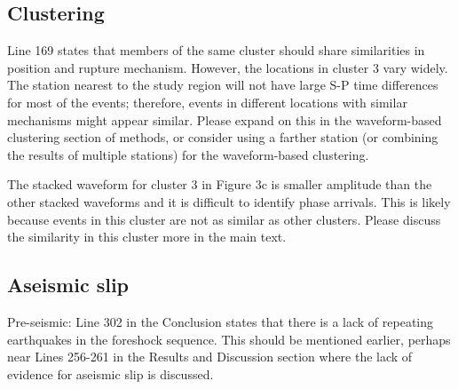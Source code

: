 \documentclass[10pt]{extarticle}
\begin{document}
\begin{Answer}
 \WorkInProgressRevTask
\end{Answer}
%
%

\subsection*{Clustering}

\begin{ReviewerComment}{1}
\noindent 
Line 169 states that members of the same cluster should share similarities in position and rupture mechanism.  However, the locations in cluster 3 vary widely. The station nearest to the study region will not have large S-P time differences for most of the events; therefore, events in different locations with similar mechanisms might appear similar. Please expand on this in the waveform-based clustering section of methods, or consider using a farther station (or combining the results of multiple stations) for the waveform-based clustering.

\end{ReviewerComment}


\begin{Answer}
 \WorkInProgressRevTask
\end{Answer}
%
%



\begin{ReviewerComment}{1}
\noindent 
The stacked waveform for cluster 3 in Figure 3c is smaller amplitude than the other stacked waveforms and it is difficult to identify phase arrivals. This is likely because events in this cluster are not as similar as other clusters. Please discuss the similarity in this cluster more in the main text.

\end{ReviewerComment}


\begin{Answer}
 \WorkInProgressRevTask
\end{Answer}
%
%


\subsection*{Aseismic slip}


\begin{ReviewerComment}{1}
\noindent 
Pre-seismic: Line 302 in the Conclusion states that there is a lack of repeating earthquakes in the foreshock sequence. This should be mentioned earlier, perhaps near Lines 256-261 in the Results and Discussion section where the lack of evidence for aseismic slip is discussed.

\end{ReviewerComment}
\end{document}
